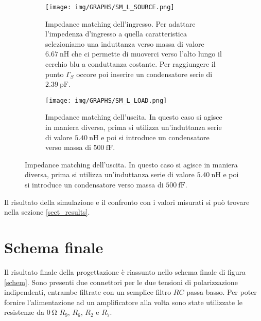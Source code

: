 \documentclass[12pt,oneside]{book}
\begin{document}
\begin{figure}[!htbp]
    \centering
    \begin{subfigure}[t]{0.48\textwidth}
        \centering
        \texttt{[image: img/GRAPHS/SM\_L\_SOURCE.png]}
        \caption{Impedance matching dell'ingresso. Per adattare l'impedenza d'ingresso a quella caratteristica selezioniamo una induttanza verso massa di valore $\SI{6.67}{\nano\henry}$ che ci permette di muoverci verso l'alto lungo il cerchio blu a conduttanza costante. Per raggiungere il punto $\Gamma_{S}$ occore poi inserire un condensatore serie di $\SI{2.39}{\pico\farad}$.}
    \end{subfigure}
    \hfill
    \begin{subfigure}[t]{0.48\textwidth}
        \centering
        \texttt{[image: img/GRAPHS/SM\_L\_LOAD.png]}
        \caption{Impedance matching dell'uscita. In questo caso si agisce in maniera diversa, prima si utilizza un'induttanza serie di valore $\SI{5.40}{\nano\henry}$ e poi si introduce un condensatore verso massa di $\SI{500}{\femto\farad}$.}
    \end{subfigure}
    \hfill
\end{figure}

Il risultato della simulazione e il confronto con i valori misurati si può trovare nella sezione \ref{sect_results}.
\section{Schema finale}
Il risultato finale della progettazione è riassunto nello schema finale di figura \ref{schem}. Sono presenti due connettori per le due tensioni di polarizzazione indipendenti, entrambe filtrate con un semplice filtro $RC$ passa basso. Per poter fornire l'alimentazione ad un amplificatore alla volta sono state utilizzate le resistenze da $\SI{0}{\ohm}$ $R_{9}$, $R_{6}$, $R_{2}$ e $R_{7}$.
\end{document}
